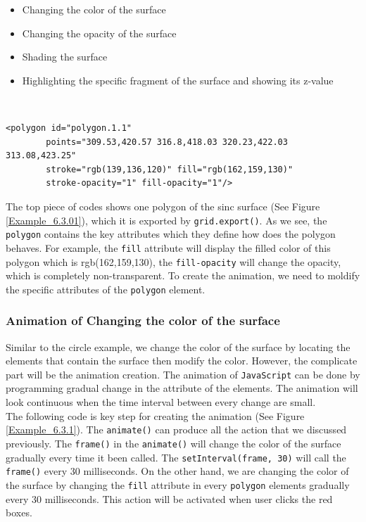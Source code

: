 \documentclass[11pt,twoside]{report}
\begin{document}
\begin{itemize}
	\item Changing the color of the surface
	\item Changing the opacity of the surface
	\item Shading the surface
	\item Highlighting the specific fragment of the surface and showing its z-value  
\end{itemize}
\\

\begin{lstlisting}
<polygon id="polygon.1.1" 
        points="309.53,420.57 316.8,418.03 320.23,422.03 313.08,423.25" 
        stroke="rgb(139,136,120)" fill="rgb(162,159,130)" 
        stroke-opacity="1" fill-opacity="1"/>
\end{lstlisting}
The top piece of codes shows one polygon of the sinc surface (See Figure \ref{Example_6.3.01}), which it is exported by \texttt{grid.export()}. As we see, the \texttt{polygon} contains the key attributes which they define how does the polygon behaves. For example, the \texttt{fill} attribute will display the filled color of this polygon which is rgb(162,159,130), the \texttt{fill-opacity} will change the opacity, which is completely non-transparent.
To create the animation, we need to moldify the specific attributes of the \texttt{polygon} element. 
 
\newpage
\subsubsection*{Animation of Changing the color of the surface}
Similar to the circle example, we change the color of the surface by locating the elements that contain the surface then modify the color. However, the complicate part will be the animation creation. The animation of \texttt{JavaScript} can be done by programming gradual change in the attribute of the elements. The animation will look continuous when the time interval between every change are small.\\

The following code is key step for creating the animation (See Figure \ref{Example_6.3.1}). The \texttt{animate()} can produce all the action that we discussed previously. The \texttt{frame()} in the \texttt{animate()} will change the color of the surface gradually every time it been called.  The \texttt{setInterval(frame, 30)} will call the \texttt{frame()} every 30 milliseconds. On the other hand, we are changing the color of the surface by changing the \texttt{fill} attribute in every \texttt{polygon} elements gradually every 30 milliseconds. This action will be activated when user clicks the red boxes.
\end{document}
